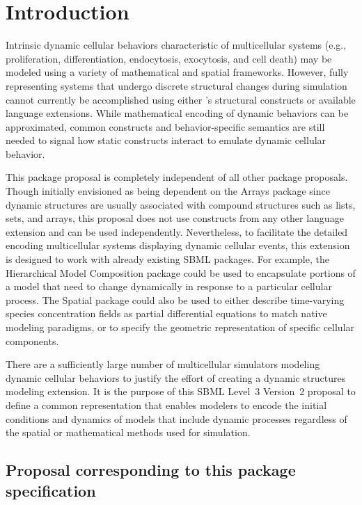 
\section{Introduction}
\label{sec:intro}

Intrinsic dynamic cellular behaviors characteristic of multicellular systems (e.g., proliferation, differentiation, endocytosis, exocytosis, and cell death) may be modeled using a variety of mathematical and spatial frameworks. However, fully representing systems that undergo discrete structural changes during simulation cannot currently be accomplished using either \sbmlthreecore 's structural constructs or available language extensions. While mathematical encoding of dynamic behaviors can be approximated, common constructs and behavior-specific semantics are still needed to signal how static constructs interact to emulate dynamic cellular behavior.

This package proposal is completely independent of all other package proposals. Though initially envisioned as being dependent on the Arrays package since dynamic structures are usually associated with compound structures such as lists, sets, and arrays, this proposal does not use constructs from any other language extension and can be used independently. Nevertheless, to facilitate the detailed encoding multicellular systems displaying dynamic cellular events, this extension is designed to work with already existing SBML packages. For example, the Hierarchical Model Composition package could be used to encapsulate portions of a model that need to change dynamically in response to a particular cellular process. The Spatial package could also be used to either describe time-varying species concentration fields as partial differential equations to match native modeling paradigms, or to specify the geometric representation of specific cellular components.

There are a sufficiently large number of multicellular simulators modeling dynamic cellular behaviors to justify the effort of creating a dynamic structures modeling extension. It is the purpose of this SBML Level~3 Version~2 proposal to define a common representation that enables modelers to encode the initial conditions and dynamics of  models that include dynamic processes regardless of the spatial or mathematical methods used for simulation.  

\subsection{Proposal corresponding to this package specification}
\label{subsec:intro}

